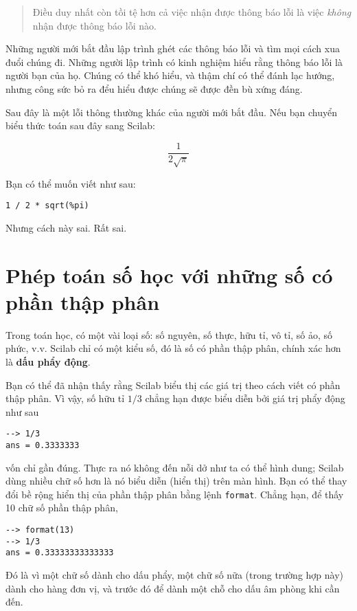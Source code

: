 \documentclass[12pt]{book}
\begin{document}
\begin{quote}
Điều duy nhất còn tồi tệ hơn cả việc nhận được thông báo lỗi là việc 
{\em không} nhận được thông báo lỗi nào.
\end{quote}

Những người mới bắt đầu lập trình ghét các thông báo lỗi và tìm mọi cách
xua đuổi chúng đi. Những người lập trình có kinh nghiệm hiểu rằng thông
báo lỗi là người bạn của họ. Chúng có thể khó hiểu, và thậm chí có thể
đánh lạc hướng, nhưng công sức bỏ ra đểu hiểu được chúng sẽ được
đền bù xứng đáng.

Sau đây là một lỗi thông thường khác của người mới bắt đầu. Nếu bạn 
chuyển biểu thức toán sau đây sang Scilab:

\[ \frac{1}{2 \sqrt \pi}\]

Bạn có thể muốn viết như sau:

\begin{verbatim}
1 / 2 * sqrt(%pi)
\end{verbatim}
%
Nhưng cách này sai. Rất sai.


\section{Phép toán số học với những số có phần thập phân}

Trong toán học, có một vài loại số: số nguyên, số thực, hữu tỉ, vô tỉ,
số ảo, số phức, v.v. Scilab chỉ có một kiểu số, đó là số có phần
thập phân, chính xác hơn là {\bf dấu phẩy động}.

Bạn có thể đã nhận thấy rằng Scilab biểu thị các giá trị theo cách
viết có phần thập phân. Vì vậy, số hữu tỉ $1/3$ chẳng hạn được biểu
diễn bởi giá trị phẩy động như sau

\begin{verbatim}
--> 1/3
ans = 0.3333333
\end{verbatim}
%
\noindent vốn chỉ gần đúng. Thực ra nó không đến nỗi dở như ta
có thể hình dung; Scilab dùng nhiều chữ số hơn là nó biểu
diễn (hiển thị) trên màn hình. Bạn có thể thay đổi bề rộng hiển thị
của phần thập phân bằng lệnh {\tt format}. Chẳng hạn, để thấy
10 chữ số phần thập phân,

\begin{verbatim}
--> format(13)
--> 1/3
ans = 0.33333333333333
\end{verbatim}
%
Đó là vì một chữ số dành cho dấu phẩy, một chữ số nữa (trong
trường hợp này) dành cho hàng đơn vị, và trước đó để dành một
chỗ cho dấu âm phòng khi cần đến.
\end{document}
